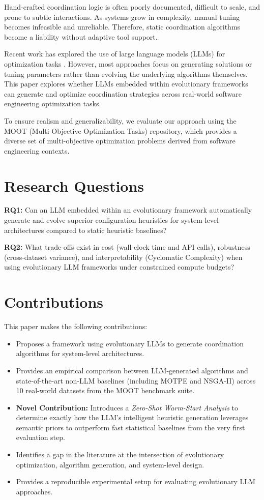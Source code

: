 \documentclass[sigconf,nonacm]{acmart}
\begin{document}
Hand-crafted coordination logic is often poorly documented, difficult to scale, and prone to subtle interactions. As systems grow in complexity, manual tuning becomes infeasible and unreliable. Therefore, static coordination algorithms become a liability without adaptive tool support.

Recent work has explored the use of large language models (LLMs) for optimization tasks \cite{romera2023mathematical}. However, most approaches focus on generating solutions or tuning parameters rather than evolving the underlying algorithms themselves. This paper explores whether LLMs embedded within evolutionary frameworks can generate and optimize coordination strategies across real-world software engineering optimization tasks.

To ensure realism and generalizability, we evaluate our approach using the MOOT (Multi-Objective Optimization Tasks) repository, which provides a diverse set of multi-objective optimization problems derived from software engineering contexts.

\section{Research Questions}

\textbf{RQ1:} Can an LLM embedded within an evolutionary framework automatically generate and evolve superior configuration heuristics for system-level architectures compared to static heuristic baselines?

\textbf{RQ2:} What trade-offs exist in cost (wall-clock time and API calls), robustness (cross-dataset variance), and interpretability (Cyclomatic Complexity) when using evolutionary LLM frameworks under constrained compute budgets?

\section{Contributions}

This paper makes the following contributions:
\begin{itemize}
\item Proposes a framework using evolutionary LLMs to generate coordination algorithms for system-level architectures.
\item Provides an empirical comparison between LLM-generated algorithms and state-of-the-art non-LLM baselines (including MOTPE and NSGA-II) across 10 real-world datasets from the MOOT benchmark suite.
\item \textbf{Novel Contribution:} Introduces a \emph{Zero-Shot Warm-Start Analysis} to determine exactly how the LLM's intelligent heuristic generation leverages semantic priors to outperform fast statistical baselines from the very first evaluation step.
\item Identifies a gap in the literature at the intersection of evolutionary optimization, algorithm generation, and system-level design.
\item Provides a reproducible experimental setup for evaluating evolutionary LLM approaches.
\end{itemize}
\end{document}
